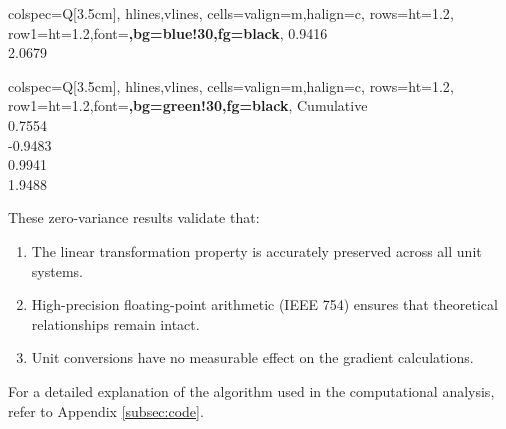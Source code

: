 \documentclass{article}
\begin{document}
\begin{center}
\begin{minipage}[t]{3.5cm}
\begin{tblr}{
				colspec={Q[3.5cm]},
				hlines,vlines,
				cells={valign=m,halign=c},
				rows={ht=1.2\baselineskip},
				row{1}={ht=1.2\baselineskip,font=\bfseries,bg=blue!30,fg=black},
			}
			{0.9416} \\
			{2.0679} \\ 
		\end{tblr}
	\end{minipage}
	\hspace{1em}
	\begin{minipage}[t]{3.5cm}
		\centering
		\begin{tblr}{
				colspec={Q[3.5cm]},
				hlines,vlines,
				cells={valign=m,halign=c},
				rows={ht=1.2\baselineskip},
				row{1}={ht=1.2\baselineskip,font=\bfseries,bg=green!30,fg=black},
			}
			Cumulative \\
			{0.7554} \\
			{-0.9483} \\
			{0.9941} \\
			{1.9488} \\
		\end{tblr}
	\end{minipage}
\end{center}
\label{Consistent Gradient Values Across Units}

\vspace{1em}

These zero-variance results validate that:

\begin{enumerate}
	\item The linear transformation property is accurately preserved across all unit systems.
	\item High-precision floating-point arithmetic (IEEE 754) ensures that theoretical relationships remain intact.
	\item Unit conversions have no measurable effect on the gradient calculations.
\end{enumerate}

For a detailed explanation of the algorithm used in the computational analysis, refer to Appendix \ref{subsec:code}.


	\newpage\restoregeometry
	
\end{document}
